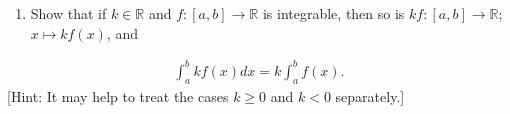 \documentclass[letterpaper,10pt,english]{jupyterBook}
\begin{document}
\label{\detokenize{Problems:id70}}\begin{enumerate}
%
\setcounter{enumi}{69}
\item {} 
\sphinxAtStartPar
Show that if \(k\in\mathbb{R}\) and \(f:[a,b]\to\mathbb{R}\) is integrable, then so is \(kf:[a,b]\to\mathbb{R}\); \(x\mapsto kf(x)\), and

\end{enumerate}
\begin{equation*}
\begin{split}
\int_a^b kf(x)dx = k\int_a^bf(x).
\end{split}
\end{equation*}
\sphinxAtStartPar
{[}Hint: It may help to treat the cases \(k\geq 0\) and \(k<0\) separately.{]}
\end{document}
